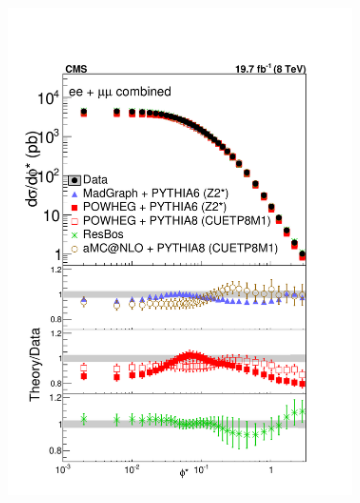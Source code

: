 \begin{figure}
    \centering
   \begin{subfigure}[b]{0.49\textwidth}
    \includegraphics[width=\linewidth]{figures/Results/Unfolded1DAbsolute.pdf}
    \end{subfigure}
    \begin{subfigure}[b]{0.49\textwidth}

\end{subfigure}
\end{figure}
